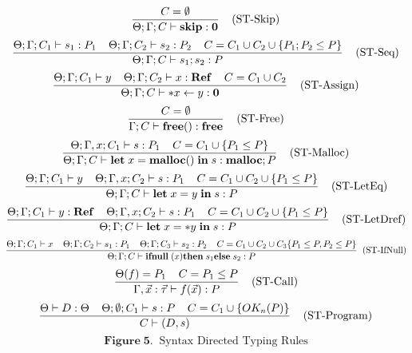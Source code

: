 $$
     \frac{ C = \emptyset}
           {\Theta; \Gamma; C \vdash \mathbf{skip} : \mathbf{0}}
      \; \; \; \; \mbox{(ST-Skip)}
$$
$$
      \frac{\Theta;\Gamma ; C_{1} \vdash s_{1} : P_{1} \; \; \; \; \Theta; \Gamma ; C_{2} \vdash s_{2} : P_{2} \; \; \; \; C = C_{1}\cup C_{2} \cup \{ P_{1};P_{2} \le P\}}
      {\Theta;\Gamma; C \vdash s_{1};s_{2} : P}
      \; \; \; \; \mbox{(ST-Seq)}
$$
$$
      \frac{\Theta;\Gamma;C_{1} \vdash y \; \; \; \; \Theta;\Gamma; C_{2} \vdash x : \mathbf{Ref} \; \; \; \; C = C_{1}\cup C_{2}}
      {\Theta;\Gamma; C \vdash *x \leftarrow y : \mathbf{0}}
      \; \; \; \; \mbox{(ST-Assign)}
$$
$$
      \frac{C = \emptyset}
      {\Gamma ; C \vdash \mathbf{free}() : \mathbf{free}}
     \; \; \; \; \mbox{(ST-Free)}
$$
$$
     \frac{\Theta;\Gamma, x ; C_{1} \vdash s : P_{1} \; \; \; \; C = C_{1} \cup\{P_{1}\le P\}}
     {\Theta;\Gamma; C \vdash \mathbf{let}\; x = \mathbf{malloc}() \; \mathbf{in}\; s : \mathbf{malloc} ; P}
     \; \; \; \; \mbox{(ST-Malloc)}
$$
$$
     \frac{\Theta;\Gamma; C_{1} \vdash y \; \; \; \; \Theta;\Gamma, x ; C_{2} \vdash s : P_{1} \; \; \; \; C = C_{1}\cup C_{2} \cup \{P_{1} \le P \}}
     {\Theta;\Gamma ; C \vdash \mathbf{let}\; x = y \;  \mathbf{in}\; s : P}
     \; \; \; \; \mbox{(ST-LetEq)}
$$
$$
     \frac{\Theta;\Gamma ; C_{1} \vdash y: \mathbf{Ref} \; \; \; \; \Theta;\Gamma, x ; C_{2} \vdash s : P_{1} \; \; \; \; C = C_{1}\cup C_{2}\cup\{P_{1} \le P\}}
     {\Theta;\Gamma ; C \vdash \mathbf{let}\; x = *y \; \mathbf{in}\; s : P}
     \; \; \; \; \mbox{(ST-LetDref)}
$$
$$
     \frac{\Theta;\Gamma; C_{1} \vdash x \; \; \; \; \Theta;\Gamma; C_{2} \vdash s_{1} : P_{1} \; \; \; \; \Theta;\Gamma; C_{3} \vdash s_{2} : P_{2}  \; \; \; \;  C = C_{1} \cup C_{2} \cup C_{3} \{P_{1}\le P, P_{2}\le P \}}
     {\Theta;\Gamma; C \vdash \mathbf{ifnull}\;(x) \mathbf{then}\; s_{1} \mathbf{else}\; s_{2} : P }
    \; \;  \mbox{(ST-IfNull)}
$$
$$
     \frac{\Theta(f) = P_{1} \; \; \; \; C = P_{1} \le P}
     {\Gamma,\vec{x}:\vec{\tau} \vdash f(\vec{x}) : P }
     \; \; \; \; \mbox{(ST-Call)}
$$
$$
     \frac{\Theta \vdash D : \Theta \; \; \; \; \Theta ; \emptyset ; C_{1} \vdash s : P \; \; \; \; C = C_{1}\cup\{OK_{n}(P)\}}
     {C \vdash (D , s) }
     \; \; \; \; \mbox{(ST-Program)}
$$
$$
    \mathbf{Figure \; 5.} \;\; \mbox{Syntax Directed Typing Rules}
$$
